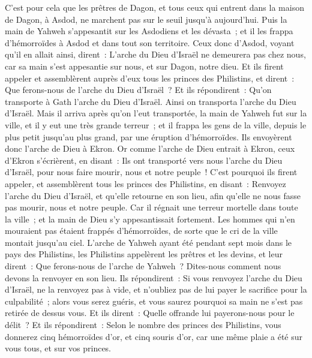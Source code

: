 \begin{multicols}{2}
C'est pour cela que les prêtres de Dagon, et tous ceux qui entrent dans la maison de Dagon, à Asdod, ne marchent pas sur le seuil jusqu'à aujourd'hui.
Puis la main de Yahweh s'appesantit sur les Asdodiens et les dévasta~; et il les frappa d'hémorroïdes à Asdod et dans tout son territoire.
Ceux donc d'Asdod, voyant qu'il en allait ainsi, dirent~: L'arche du Dieu d'Israël ne demeurera pas chez nous, car sa main s'est appesantie sur nous, et sur Dagon, notre dieu.
Et ils firent appeler et assemblèrent auprès d'eux tous les princes des Philistins, et dirent~: Que ferons-nous de l'arche du Dieu d'Israël~? Et ils répondirent~: Qu'on transporte à Gath l'arche du Dieu d'Israël. Ainsi on transporta l'arche du Dieu d'Israël.
Mais il arriva après qu'on l'eut transportée, la main de Yahweh fut sur la ville, et il y eut une très grande terreur~; et il frappa les gens de la ville, depuis le plus petit jusqu'au plus grand, par une éruption d'hémorroïdes.
Ils envoyèrent donc l'arche de Dieu à Ekron. Or comme l'arche de Dieu entrait à Ekron, ceux d'Ekron s'écrièrent, en disant~: Ils ont transporté vers nous l'arche du Dieu d'Israël, pour nous faire mourir, nous et notre peuple~!
C'est pourquoi ils firent appeler, et assemblèrent tous les princes des Philistins, en disant~: Renvoyez l'arche du Dieu d'Israël, et qu'elle retourne en son lieu, afin qu'elle ne nous fasse pas mourir, nous et notre peuple. Car il régnait une terreur mortelle dans toute la ville~; et la main de Dieu s'y appesantissait fortement.
Les hommes qui n'en mouraient pas étaient frappés d'hémorroïdes, de sorte que le cri de la ville montait jusqu'au ciel.
\VerseOne{}L'arche de Yahweh ayant été pendant sept mois dans le pays des Philistins,
les Philistins appelèrent les prêtres et les devins, et leur dirent~: Que ferons-nous de l'arche de Yahweh~? Dites-nous comment nous devons la renvoyer en son lieu.
Ils répondirent~: Si vous renvoyez l'arche du Dieu d'Israël, ne la renvoyez pas à vide, et n'oubliez pas de lui payer le sacrifice pour la culpabilité~; alors vous serez guéris, et vous saurez pourquoi sa main ne s'est pas retirée de dessus vous.
Et ils dirent~: Quelle offrande lui payerons-nous pour le délit~? Et ils répondirent~: Selon le nombre des princes des Philistins, vous donnerez cinq hémorroïdes d'or, et cinq souris d'or, car une même plaie a été sur vous tous, et sur vos princes.

\end{multicols}
